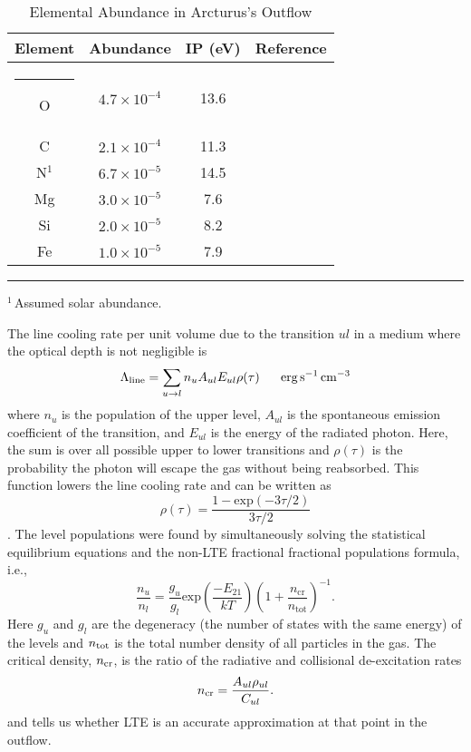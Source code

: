 \begin{table}[!ht]
\begin{center}
\caption[]{Elemental Abundance in Arcturus's Outflow}
\begin{tabular}{cccc}
\hline
\hline
\rule{0pt}{2.5ex} Element & Abundance & IP (eV) & Reference \\
\hline
\rule{-2.5pt}{2.5ex}	O &  $4.7\times 10^{-4}$ & 13.6 & \cite{ramirez_2011}\\
					C &  $2.1\times 10^{-4}$ & 11.3 & \cite{ramirez_2011}\\
					N$^{1}$ &  $6.7\times 10^{-5}$& 14.5 & \cite{asplund_2009}\\
					Mg & $3.0\times 10^{-5}$ & 7.6 & \cite{ramirez_2011}\\
					Si & $2.0\times 10^{-5}$ & 8.2 & \cite{ramirez_2011}\\
					Fe & $1.0\times 10^{-5}$ & 7.9 & \cite{decin_2003}\\
\hline
\end{tabular}
\label{tab:7.1}
\begin{minipage}{12.5cm}
\rule{-2.5pt}{2.5ex}{\footnotesize $^{1}$\,Assumed solar abundance.}
\end{minipage}
\end{center}
\end{table}

The line cooling rate per unit volume due to the transition $ul$ in a medium where the optical depth is not negligible is 
\begin{equation}
\Lambda _{\rm{line}} =\sum_{u\rightarrow l} n_{u}A_{ul}E_{ul}\rho (\tau) \ \ \ \ \ \rm{erg}\,\rm{s^{-1}\,cm^{-3}}
\end{equation}
where $n_{u}$ is the population of the upper level, $A_{ul}$ is the spontaneous emission coefficient of the transition, and $E_{ul}$ is the energy of the radiated photon. Here, the sum is over all possible upper to lower transitions and $\rho (\tau)$ is the probability the photon will escape the gas without being reabsorbed. This function lowers the line cooling rate and can be written as 
\begin{equation}
\rho (\tau) = \frac{1-\mathrm{exp}(-3\tau /2)}{3\tau /2}
\end{equation}
\citep{castor_2004}. The level populations were found by simultaneously solving the statistical equilibrium equations and the non-LTE fractional fractional populations formula, i.e.,
\begin{equation}
\frac{n_u}{n_l}=\frac{g_u}{g_l}\mathrm{exp} \left( \frac{-E_{21}}{kT}\right)\left( 1+\frac{n_{\mathrm{cr}}}{n_{\mathrm{tot}}} \right)^{-1}.
\end{equation}
Here $g_{u}$ and $g_{l}$ are the degeneracy (the number of states with the same energy) of the levels and $n_{\rm{tot}}$ is the total number density of all particles in the gas. The critical density, $n_{\rm{cr}}$, is the ratio of the radiative and collisional de-excitation rates
\begin{equation}
n_{\rm{cr}}=\frac{A_{ul}\rho _{ul}}{C_{ul}}.
\end{equation}
and tells us whether LTE is an accurate approximation at that point in the outflow.

